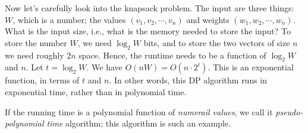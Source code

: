 Now let's carefully look into the knapsack problem. The input are three things: $W$, which is a number;
the values $(v_1, v_2, \cdots, v_n)$ and weights $(w_1, w_2,\cdots, w_n)$.
What is the input size, i.e., what is the memory needed to store the input?
To store the number $W$, we need $\log_2 W$ bits, and to store the two vectors of size $n$ we need roughly $2n$ space.
Hence, the runtime needs to be a function of $\log_2 W$ and $n$.
Let $t=\log_2 W$. We have $O(nW) = O(n\cdot 2^t)$. This is an exponential function, in terms of $t$ and $n$.
In other words, this DP algorithm runs in exponential time, rather than in polynomial time.

If the running time is a polynomial function of \emph{numerail values}, we call it
\emph{pseudo-polynomial time} algorithm; this algorithm is such an example.
